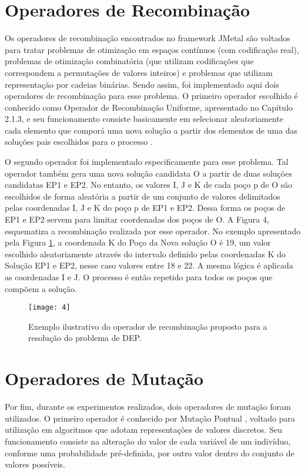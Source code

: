 \section{Operadores de Recombinação}

Os operadores de recombinação encontrados no framework JMetal são voltados para tratar problemas de otimização em espaços contínuos (com codificação real), problemas de otimização combinatória (que utilizam codificações que correspondem a permutações de valores inteiros) e problemas que utilizam representação por cadeias binárias. Sendo assim, foi implementado aqui dois operadores de recombinação para esse problema. O primeiro operador escolhido é conhecido como Operador de Recombinação Uniforme, apresentado no Capítulo 2.1.3, e seu funcionamento consiste basicamente em selecionar aleatoriamente cada elemento que comporá uma nova solução a partir dos elementos de uma das soluções pais escolhidos para o processo \cite{Talbi2009, Kacprzyk2015}.

O segundo operador foi implementado especificamente para esse problema.  Tal operador também gera uma nova solução candidata O a partir de duas soluções candidatas EP1 e EP2. No entanto, os valores I, J e K de cada poço p de O são escolhidos de forma aleatória a partir de um conjunto de valores delimitados pelas coordenadas I, J e K do poço p de EP1 e EP2. Dessa forma os poços de EP1 e EP2 servem para limitar coordenadas dos poços de O. A Figura 4, esquematiza a recombinação realizada por esse operador. No exemplo apresentado pela Figura \ref{fig:fig3_2}, a coordenada K do Poço da Nova solução O é 19, um valor escolhido aleatoriamente através do intervalo definido pelas coordenadas K do Solução EP1 e EP2, nesse caso valores entre 18 e 22. A mesma lógica é aplicada as coordenadas I e J. O processo é então repetido para todos os poços que compõem a solução.

\begin{figure}[htb]
  \centering
  \texttt{[image: 4]}
  \caption{Exemplo ilustrativo do operador de recombinação proposto para a resolução do problema de DEP.}
  \label{fig:fig3_2}
\end{figure}

\section{Operadores de Mutação}

Por fim, durante os experimentos realizados, dois operadores de mutação foram utilizados. O primeiro operador é conhecido por Mutação Pontual \cite{Kacprzyk2015}, voltado para utilização em algoritmos que adotam representações de valores discretos. Seu funcionamento consiste na alteração do valor de cada variável de um indivíduo, conforme uma probabilidade pré-definida, por outro valor dentro do conjunto de valores possíveis.

